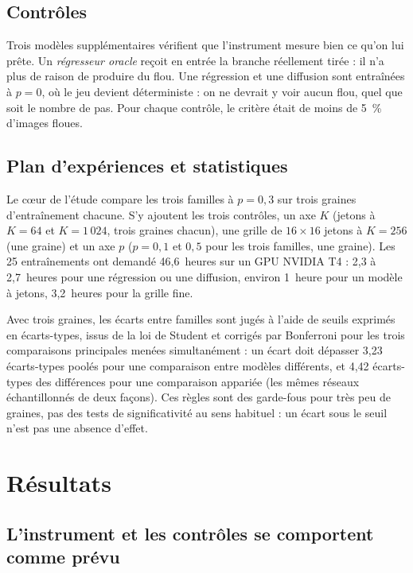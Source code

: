 \documentclass[a4paper, 11pt]{article}
\begin{document}
\subsection{Contrôles}

Trois modèles supplémentaires vérifient que l'instrument mesure bien ce qu'on lui prête. Un \emph{régresseur oracle}
reçoit en entrée la branche réellement tirée : il n'a plus de raison de produire du flou. Une régression et une diffusion
sont entraînées à $p = 0$, où le jeu devient déterministe : on ne devrait y voir aucun flou, quel que soit le nombre de pas.
Pour chaque contrôle, le critère était de moins de 5~\% d'images floues.

\subsection{Plan d'expériences et statistiques}

Le c\oe ur de l'étude compare les trois familles à $p = 0{,}3$ sur trois graines d'entraînement chacune. S'y ajoutent les
trois contrôles, un axe $K$ (jetons à $K = 64$ et $K = 1\,024$, trois graines chacun), une grille de $16\times16$ jetons à
$K = 256$ (une graine) et un axe $p$ ($p = 0{,}1$ et $0{,}5$ pour les trois familles, une graine). Les 25 entraînements ont
demandé 46,6~heures sur un GPU NVIDIA T4 : 2,3 à 2,7~heures pour une régression ou une diffusion, environ 1~heure pour un
modèle à jetons, 3,2~heures pour la grille fine.

Avec trois graines, les écarts entre familles sont jugés à l'aide de seuils exprimés en écarts-types, issus de la loi de
Student et corrigés par Bonferroni pour les trois comparaisons principales menées simultanément : un écart doit dépasser
3,23 écarts-types poolés pour une comparaison entre modèles différents, et 4,42 écarts-types des différences pour une
comparaison appariée (les mêmes réseaux échantillonnés de deux façons). Ces règles sont des garde-fous pour très peu de
graines, pas des tests de significativité au sens habituel : un écart sous le seuil n'est pas une absence d'effet.

\section{Résultats}\label{sec:resultats}

\subsection{L'instrument et les contrôles se comportent comme prévu}
\end{document}
